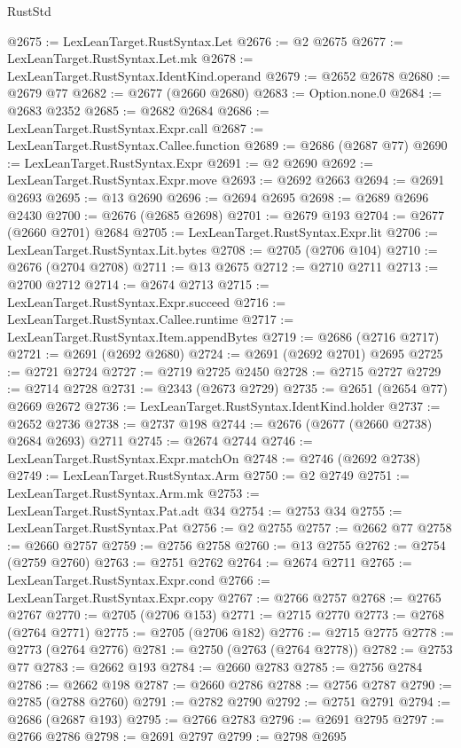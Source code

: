 \begin{lexlean}{RustStd}
\begin{coremodule}
@2675 := LexLeanTarget.RustSyntax.Let
@2676 := @2 @2675
@2677 := LexLeanTarget.RustSyntax.Let.mk
@2678 := LexLeanTarget.RustSyntax.IdentKind.operand
@2679 := @2652 @2678
@2680 := @2679 @77
@2682 := @2677 (@2660 @2680)
@2683 := Option.none.{0}
@2684 := @2683 @2352
@2685 := @2682 @2684
@2686 := LexLeanTarget.RustSyntax.Expr.call
@2687 := LexLeanTarget.RustSyntax.Callee.function
@2689 := @2686 (@2687 @77)
@2690 := LexLeanTarget.RustSyntax.Expr
@2691 := @2 @2690
@2692 := LexLeanTarget.RustSyntax.Expr.move
@2693 := @2692 @2663
@2694 := @2691 @2693
@2695 := @13 @2690
@2696 := @2694 @2695
@2698 := @2689 @2696 @2430
@2700 := @2676 (@2685 @2698)
@2701 := @2679 @193
@2704 := @2677 (@2660 @2701) @2684
@2705 := LexLeanTarget.RustSyntax.Expr.lit
@2706 := LexLeanTarget.RustSyntax.Lit.bytes
@2708 := @2705 (@2706 @104)
@2710 := @2676 (@2704 @2708)
@2711 := @13 @2675
@2712 := @2710 @2711
@2713 := @2700 @2712
@2714 := @2674 @2713
@2715 := LexLeanTarget.RustSyntax.Expr.succeed
@2716 := LexLeanTarget.RustSyntax.Callee.runtime
@2717 := LexLeanTarget.RustSyntax.Item.appendBytes
@2719 := @2686 (@2716 @2717)
@2721 := @2691 (@2692 @2680)
@2724 := @2691 (@2692 @2701) @2695
@2725 := @2721 @2724
@2727 := @2719 @2725 @2450
@2728 := @2715 @2727
@2729 := @2714 @2728
@2731 := @2343 (@2673 @2729)
@2735 := @2651 (@2654 @77) @2669 @2672
@2736 := LexLeanTarget.RustSyntax.IdentKind.holder
@2737 := @2652 @2736
@2738 := @2737 @198
@2744 := @2676 (@2677 (@2660 @2738) @2684 @2693) @2711
@2745 := @2674 @2744
@2746 := LexLeanTarget.RustSyntax.Expr.matchOn
@2748 := @2746 (@2692 @2738)
@2749 := LexLeanTarget.RustSyntax.Arm
@2750 := @2 @2749
@2751 := LexLeanTarget.RustSyntax.Arm.mk
@2753 := LexLeanTarget.RustSyntax.Pat.adt @34
@2754 := @2753 @34
@2755 := LexLeanTarget.RustSyntax.Pat
@2756 := @2 @2755
@2757 := @2662 @77
@2758 := @2660 @2757
@2759 := @2756 @2758
@2760 := @13 @2755
@2762 := @2754 (@2759 @2760)
@2763 := @2751 @2762
@2764 := @2674 @2711
@2765 := LexLeanTarget.RustSyntax.Expr.cond
@2766 := LexLeanTarget.RustSyntax.Expr.copy
@2767 := @2766 @2757
@2768 := @2765 @2767
@2770 := @2705 (@2706 @153)
@2771 := @2715 @2770
@2773 := @2768 (@2764 @2771)
@2775 := @2705 (@2706 @182)
@2776 := @2715 @2775
@2778 := @2773 (@2764 @2776)
@2781 := @2750 (@2763 (@2764 @2778))
@2782 := @2753 @77
@2783 := @2662 @193
@2784 := @2660 @2783
@2785 := @2756 @2784
@2786 := @2662 @198
@2787 := @2660 @2786
@2788 := @2756 @2787
@2790 := @2785 (@2788 @2760)
@2791 := @2782 @2790
@2792 := @2751 @2791
@2794 := @2686 (@2687 @193)
@2795 := @2766 @2783
@2796 := @2691 @2795
@2797 := @2766 @2786
@2798 := @2691 @2797
@2799 := @2798 @2695

\end{coremodule}
\end{lexlean}
